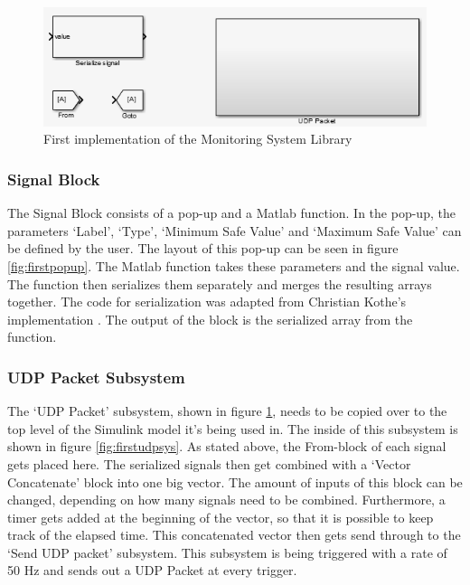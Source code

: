 \begin{figure}[H]
	\centering
	\includegraphics[width=.75\textwidth]{implementation/library}
	\caption{First implementation of the Monitoring System Library} 
	\label{fig:firstmonsys}
\end{figure}

\subsubsection{Signal Block}
The Signal Block consists of a pop-up and a Matlab function. In the pop-up, the parameters `Label', `Type', `Minimum Safe Value' and `Maximum Safe Value' can be defined by the user. The layout of this pop-up can be seen in figure \ref{fig:firstpopup}. The Matlab function takes these parameters and the signal value. The function then serializes them separately and merges the resulting arrays together. The code for serialization was adapted from Christian Kothe's implementation \cite{web:serialize}. The output of the block is the serialized array from the function.

\subsubsection{UDP Packet Subsystem}
The `UDP Packet' subsystem, shown in figure \ref{fig:firstmonsys}, needs to be copied over to the top level of the Simulink model it's being used in. The inside of this subsystem is shown in figure \ref{fig:firstudpsys}. As stated above, the From-block of each signal gets placed here. The serialized signals then get combined with a `Vector Concatenate' block into one big vector. The amount of inputs of this block can be changed, depending on how many signals need to be combined. Furthermore, a timer gets added at the beginning of the vector, so that it is possible to keep track of the elapsed time. This concatenated vector then gets send through to the `Send UDP packet' subsystem. This subsystem is being triggered with a rate of 50 Hz and sends out a UDP Packet at every trigger.

